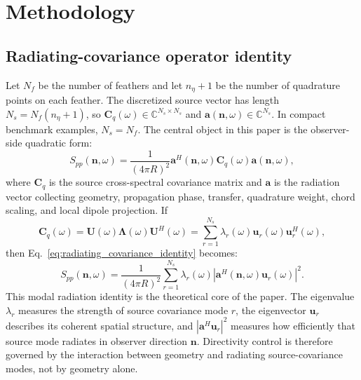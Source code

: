 \documentclass[11pt]{article}
\newcommand{\vect}[1]{\bm{#1}}
\newcommand{\mat}[1]{\bm{#1}}
\begin{document}
\section{Methodology}

\subsection{Radiating-covariance operator identity}

Let $N_f$ be the number of feathers and let $n_\eta+1$ be the number of quadrature points on each feather. The discretized source vector has length $N_s=N_f(n_\eta+1)$, so $\mat{C}_q(\omega)\in\mathbb{C}^{N_s\times N_s}$ and $\vect{a}(\vect{n},\omega)\in\mathbb{C}^{N_s}$. In compact benchmark examples, $N_s=N_f$. The central object in this paper is the observer-side quadratic form:
\begin{equation}
    S_{pp}(\vect{n},\omega)
    =
    \frac{1}{(4\pi R)^2}
    \vect{a}^{H}(\vect{n},\omega)
    \mat{C}_q(\omega)
    \vect{a}(\vect{n},\omega),
\label{eq:radiating_covariance_identity}
\end{equation}
where $\mat{C}_q$ is the source cross-spectral covariance matrix and $\vect{a}$ is the radiation vector collecting geometry, propagation phase, transfer, quadrature weight, chord scaling, and local dipole projection. If
\begin{equation}
    \mat{C}_q(\omega)
    =
    \mat{U}(\omega)\mat{\Lambda}(\omega)\mat{U}^{H}(\omega)
    =
    \sum_{r=1}^{N_s}
    \lambda_r(\omega)
    \vect{u}_r(\omega)\vect{u}_r^{H}(\omega),
\label{eq:covariance_eigendecomposition}
\end{equation}
then Eq.~\ref{eq:radiating_covariance_identity} becomes:
\begin{equation}
    S_{pp}(\vect{n},\omega)
    =
    \frac{1}{(4\pi R)^2}
    \sum_{r=1}^{N_s}
    \lambda_r(\omega)
    \left|
        \vect{a}^{H}(\vect{n},\omega)
        \vect{u}_r(\omega)
    \right|^2.
\label{eq:modal_radiation_identity}
\end{equation}
This modal radiation identity is the theoretical core of the paper. The eigenvalue $\lambda_r$ measures the strength of source covariance mode $r$, the eigenvector $\vect{u}_r$ describes its coherent spatial structure, and $\left|\vect{a}^{H}\vect{u}_r\right|^2$ measures how efficiently that source mode radiates in observer direction $\vect{n}$. Directivity control is therefore governed by the interaction between geometry and radiating source-covariance modes, not by geometry alone.
\end{document}
